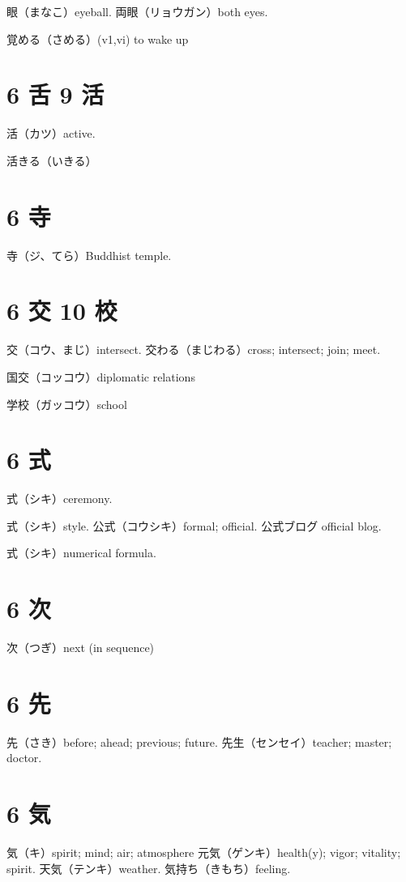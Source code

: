 眼（まなこ）eyeball.
両眼（リョウガン）both eyes.

覚める（さめる）(v1,vi) to wake up

\section{6 舌 9 活}

活（カツ）active.

活きる（いきる）

\section{6 寺}

寺（ジ、てら）Buddhist temple.

\section{6 交 10 校}

交（コウ、まじ）intersect.
交わる（まじわる）cross; intersect; join; meet.

国交（コッコウ）diplomatic relations

学校（ガッコウ）school

\section{6 式}

式（シキ）ceremony.

式（シキ）style.
公式（コウシキ）formal; official.
公式ブログ official blog.

式（シキ）numerical formula.

\section{6 次}

次（つぎ）next (in sequence)

\section{6 先}

先（さき）before; ahead; previous; future.
先生（センセイ）teacher; master; doctor.

\section{6 気}

気（キ）spirit; mind; air; atmosphere
元気（ゲンキ）health(y); vigor; vitality; spirit.
天気（テンキ）weather.
気持ち（きもち）feeling.

